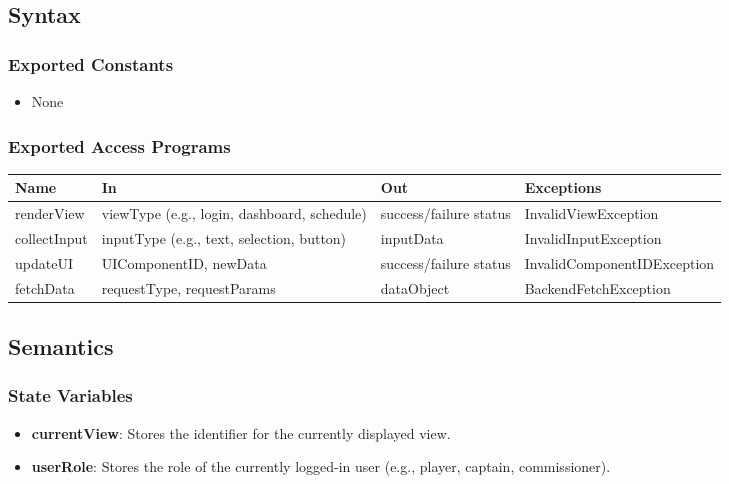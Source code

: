 \documentclass[12pt, titlepage]{article}
\begin{document}
\subsection{Syntax}

\subsubsection{Exported Constants}

\begin{itemize}
    \item None
\end{itemize}

\subsubsection{Exported Access Programs}

\begin{center}
\begin{tabularx}{\textwidth}{|l|X|X|X|}
\hline
\textbf{Name} & \textbf{In} & \textbf{Out} & \textbf{Exceptions} \\
\hline
renderView & viewType (e.g., login, dashboard, schedule) & success/failure status & InvalidViewException \\
\hline
collectInput & inputType (e.g., text, selection, button) & inputData & InvalidInputException \\
\hline
updateUI & UIComponentID, newData & success/failure status & InvalidComponentIDException \\
\hline
fetchData & requestType, requestParams & dataObject & BackendFetchException \\
\hline
\end{tabularx}
\end{center}

\subsection{Semantics}

\subsubsection{State Variables}

\begin{itemize}
    \item \textbf{currentView}: Stores the identifier for the currently displayed view.
    \item \textbf{userRole}: Stores the role of the currently logged-in user (e.g., player, captain, commissioner).
\end{itemize}
\end{document}
